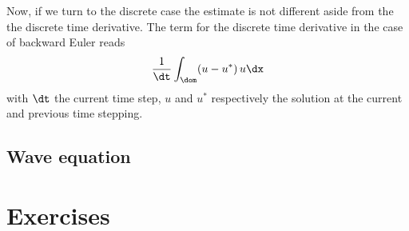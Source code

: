 \medskip
Now, if we turn to the discrete case the estimate is not different aside from the the discrete time derivative.
The term for the discrete time derivative in the case of backward Euler reads
\begin{equation*}
\dfrac{1}{\dt}\int_\dom (u - u^\ast)\, u \dx
\end{equation*}
with $\dt$ the current time step, $u$ and $u^\ast$ respectively the solution at the current and previous time stepping.

\subsection{Wave equation}

\section{Exercises}
